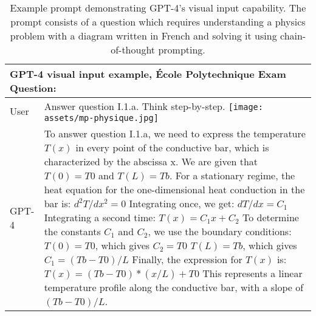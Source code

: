 \documentclass{article}
\begin{document}
\begin{table}
\begin{tabular}[]{p{0.5in}p{4.5in}}
\toprule
\multicolumn{2}{p{5in}}{
\textbf{GPT-4 visual input example, École Polytechnique Exam Question}:}\\
\midrule
User & Answer question I.1.a. Think step-by-step.\newline\newline
\texttt{[image: assets/mp-physique.jpg]}\newline
\\
GPT-4 & To answer question I.1.a, we need to express the temperature $T(x)$ in every point of the conductive bar, which is characterized by the abscissa x. We are given that $T(0) = T0$ and $T(L) = Tb$.\newline
\newline
For a stationary regime, the heat equation for the one-dimensional heat conduction in the bar is:\newline
$d^2T/dx^2 = 0$\newline
\newline
Integrating once, we get:\newline
$dT/dx = C_1$\newline
\newline
Integrating a second time:\newline
$T(x) = C_1x + C_2$\newline
\newline
To determine the constants $C_1$ and $C_2$, we use the boundary conditions:\newline
$T(0) = T0$, which gives $C_2 = T0$\newline
$T(L) = Tb$, which gives $C_1 = (Tb - T0) / L$\newline
\newline
Finally, the expression for $T(x)$ is:\newline
$T(x) = (Tb - T0) * (x / L) + T0$\newline
This represents a linear temperature profile along the conductive bar, with a slope of $(Tb - T0) / L$.\\
\bottomrule
\end{tabular}
\caption{Example prompt demonstrating GPT-4's visual input capability. The prompt consists of a question which requires understanding a physics problem with a diagram written in French and solving it using chain-of-thought prompting.}
\label{table:visual_input_ecole}
\end{table}
\end{document}
